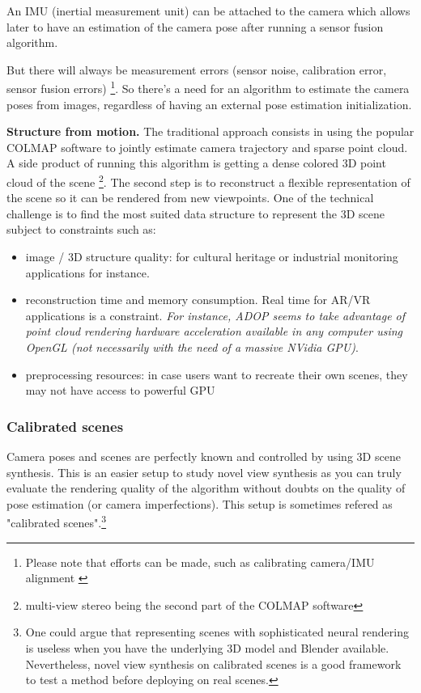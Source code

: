 \noindent An IMU (inertial measurement unit) can be attached to the camera which allows later to have an estimation of the camera pose after running a sensor fusion algorithm.

\noindent But there will always be measurement errors (sensor noise, calibration error, sensor fusion errors) \footnote{Please note that efforts can be made, such as calibrating camera/IMU alignment \cite{karpenko2011gyrostab}}. So there's a need for an algorithm to estimate the camera poses from images, regardless of having an external pose estimation initialization.

\noindent \textbf{Structure from motion.} The traditional approach consists in using the popular COLMAP software \cite{schoenberger2016sfm} to jointly estimate camera trajectory and sparse point cloud. A side product of running this algorithm is getting a dense colored 3D point cloud of the scene \footnote{multi-view stereo being the second part of the COLMAP software}. 
The second step is to reconstruct a flexible representation of the scene so it can be rendered from new viewpoints. One of the technical challenge is to find the most suited data structure to represent the 3D scene subject to constraints such as: 
\begin{itemize}
    \item image / 3D structure quality: for cultural heritage or industrial monitoring applications for instance. 
    \item reconstruction time and memory consumption. Real time for AR/VR applications is a constraint. \textit{For instance, ADOP seems to take advantage of point cloud rendering hardware acceleration available in any computer using OpenGL (not necessarily with the need of a massive NVidia GPU)}. 
    \item preprocessing resources: in case users want to recreate their own scenes, they may not have access to powerful GPU 
\end{itemize}

\subsubsection{Calibrated scenes}
\label{sec:calibrated_scenes}
Camera poses and scenes are perfectly known and controlled by using 3D scene synthesis. This is an easier setup to study novel view synthesis as you can truly evaluate the rendering quality of the algorithm without doubts on the quality of pose estimation (or camera imperfections). This setup is sometimes refered as "calibrated scenes".\footnote{One could argue that representing scenes with sophisticated neural rendering is useless when you have the underlying 3D model and Blender available. Nevertheless, novel view synthesis on calibrated scenes is a good framework to test a method before deploying on real scenes.}

